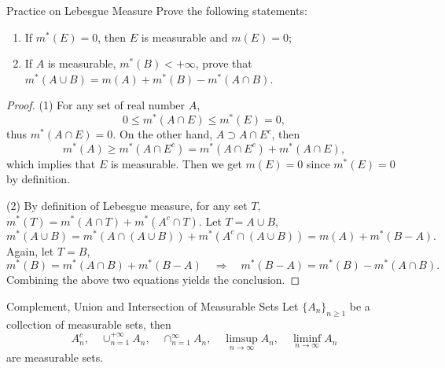 \begin{example}{Practice on Lebesgue Measure}{}
  Prove the following statements:
  \begin{enumerate}
  \item If $m^{\ast}(E) = 0$, then $E$ is measurable and $m(E) = 0$;
  \item If $A$ is measurable, $m^{\ast}(B) < +\infty$, prove that
    $m^{\ast}(A \cup B) = m(A) + m^{\ast}(B) - m^{\ast}(A \cap B)$.
  \end{enumerate}
\end{example}

\begin{proof}
  (1) For any set of real number $A$,
  \begin{equation}
    0 \leq m^{\ast}(A \cap E) \leq m^{\ast}(E) = 0,
  \end{equation}
  thus $m^{\ast}(A \cap E) = 0$. On the other hand, $A \supset A \cap E^c$,
  then
  \begin{equation}
    m^{\ast}(A) \geq m^{\ast}(A \cap E^c) = m^{\ast}(A \cap E^c) + m^{\ast}(A \cap E),
  \end{equation}
  which implies that $E$ is measurable.
  Then we get $m(E) = 0$ since $m^{\ast}(E) = 0$ by definition.

  (2) By definition of Lebesgue measure, for any set $T$,
  $m^{\ast}(T) = m^{\ast}(A \cap T) + m^{\ast}(A^c \cap T)$.
  Let $T = A \cup B$,
  \begin{equation}
    m^{\ast}(A \cup B) = m^{\ast}(A \cap (A \cup B)) + m^{\ast}(A^c \cap (A \cup B))
    = m(A) + m^{\ast}(B - A).
  \end{equation}
  Again, let $T = B$,
  \begin{equation}
    m^{\ast}(B) = m^{\ast}(A \cap B) + m^{\ast}(B - A) \quad
    \Rightarrow \quad
    m^{\ast}(B - A) = m^{\ast}(B) - m^{\ast}(A \cap B).
  \end{equation}
  Combining the above two equations yields the conclusion.
\end{proof}

\begin{theorem}{Complement, Union and Intersection of Measurable Sets}{}
  Let $\{A_n\}_{n \geq 1}$ be a collection of measurable sets, then
  \begin{equation}
    A_n^c, \quad \cup _{n=1}^{+\infty} A_n, \quad \cap_{n=1}^{\infty} A_n, \quad
    \limsup \limits _{n \rightarrow \infty} A_n, \quad \liminf \limits_{n \rightarrow \infty} A_n
  \end{equation}
  are measurable sets.
\end{theorem}

